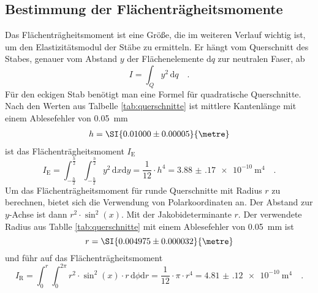 \subsection{Bestimmung der Flächenträgheitsmomente}
Das Flächenträgheitsmoment ist eine Größe, die im weiteren Verlauf wichtig ist, um den Elastizitätsmodul der Stäbe zu ermitteln.
Er hängt vom Querschnitt des Stabes, genauer vom Abstand $y$ der Flächenelemente d$q$ zur neutralen Faser, ab
\begin{equation}
I = \int_{Q} y ^2 \, \text{d}q \quad .
\end{equation}
Für den eckigen Stab benötigt man eine Formel für quadratische Querschnitte. Nach den Werten aus Talbelle \ref{tab:querschnitte} ist mittlere Kantenlänge mit einem Ablesefehler von \SI{0.05}{\milli\metre}
\begin{align}
  h = \SI{0.01000 \pm 0.00005}{\metre}
\end{align}
ist das Flächenträgheitsmoment $I_\text{E}$
\begin{equation}
I_\text{E} = \int_{-\frac{h}{2}}^{\frac{h}{2}} \int_{-\frac{h}{2}}^{\frac{h}{2}} y^2\,  \text{d}x \text{d}y = \frac{1}{12} \cdot h^4 = \SI{3.88(17)e-10}{\metre^{4}} \quad .
\label{I_E}
\end{equation}
Um das Flächenträgheitsmoment für runde Querschnitte mit Radius $r$ zu berechnen, bietet sich die Verwendung von Polarkoordinaten an. Der Abstand zur $y$-Achse ist dann $r^2 \cdot \sin^2(x)$.  Mit der Jakobideterminante $r$. Der verwendete Radius aus Tablle \ref{tab:querschnitte} mit einem Ablesefehler von \SI{0.05}{\milli\metre} ist
\begin{equation}
  r = \SI{0.004975 \pm 0.000032}{\metre}
\end{equation}
und führ auf das Flächenträgheitsmoment
\begin{equation}
I_\text{R} = \int_{0}^{r}  \int_{0}^{2\pi} r^2 \cdot \sin^2(x) \cdot r  \, \text{d}\phi \text{d}r = \frac{1}{12}\cdot \pi \cdot r^4 = \SI{4.81(12)e-10}{\metre^{4}} \quad .
\label{I_R}
\end{equation}



\vspace{1cm}
